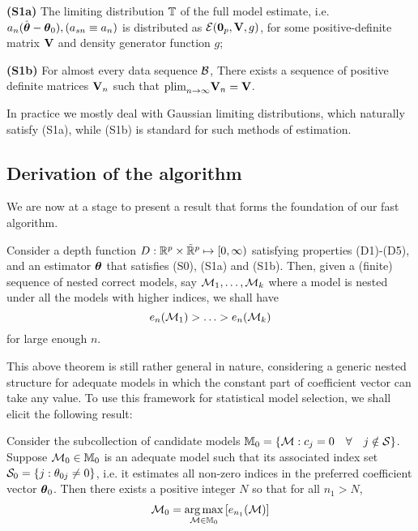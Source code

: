 \vspace{1em}
\noindent\textbf{(S1a)} The limiting distribution ${\mathbb{T}}$ of the full model estimate, i.e. $a_{n} (\hat {{\boldsymbol{\theta}}} - {\boldsymbol{\theta}}_0 ), (a_{s n} \equiv a_n)$ is distributed as ${\cal{E}} ( {\bf 0}_p, {\mathbf{V}}, g)$, for some positive-definite matrix ${\mathbf{V}}$ and density generator function $g$;

\noindent\textbf{(S1b)} For almost every data sequence ${\cal{B}}$, There exists a sequence of positive definite matrices ${\mathbf{V}}_n$ such that  $\text{plim}_{n \rightarrow \infty} {\mathbf{V}}_n = {\mathbf{V}}$.
\vspace{1em}

In practice we mostly deal with Gaussian limiting distributions, which naturally satisfy (S1a), while (S1b) is standard for such methods of estimation.

\subsection{Derivation of the algorithm}
We are now at a stage to present a result that forms the foundation of our fast algorithm.

\begin{Theorem}\label{Theorem:ThmRightNested}
Consider a depth function $D: {\mathbb{R}}^p \times \tilde {{\mathbb{R}}}^p \mapsto [0, \infty) $ satisfying properties (D1)-(D5), and an estimator ${\boldsymbol{\theta}}$ that satisfies (S0), (S1a) and (S1b). Then, given a (finite) sequence of nested correct models, say ${\cal{M}}_1, \ldots ,{\cal{M}}_k$ where a model is nested under all the models with higher indices, we shall have
%
$$ e_n({\cal{M}}_1 ) > \ldots > e_n ({\cal{M}}_k ) $$
%
for large enough $n$.
\end{Theorem}


This above theorem is still rather general in nature, considering a generic nested structure for adequate models in which the constant part of coefficient vector can take any value. To use this framework for statistical model selection, we shall elicit the following result:

\begin{Corollary}\label{Corollary:ZeroModelCorollary}
Consider the subcollection of candidate models $\mathbb M_{0} = \{ {\cal{M}}: c_{j}=0 \quad \forall \quad j \notin {\cal{S}} \}$. Suppose ${\cal{M}}_{0} \in \mathbb M_0$ is an adequate model such that its associated index set ${\cal{S}}_{0} = \{ j: \theta_{0j} \neq 0 \}$, i.e. it estimates all non-zero indices in the preferred coefficient vector ${\boldsymbol{\theta}}_0$. Then there exists a positive integer $N$ so that for all $n_1 > N$,
%
\begin{align}
{\cal{M}}_{0} = \operatorname*{arg\,max}_{ {\cal{M}} \in \mathbb M_{0}} \left[ e_{n_1} ( {\cal{M}} ) \right]
\end{align}
\end{Corollary}

